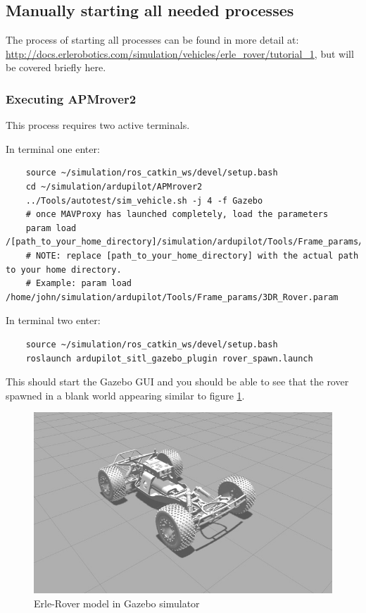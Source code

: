 \documentclass{report}
\begin{document}
\subsection{Manually starting all needed processes}
The process of starting all processes can be found in more detail at: \\ \href{http://docs.erlerobotics.com/simulation/vehicles/erle_rover/tutorial_1}{http://docs.erlerobotics.com/simulation/vehicles/erle\_rover/tutorial\_1}, but will be covered briefly here.
\subsubsection{Executing APMrover2}
This process requires two active terminals. 

In terminal one enter:
\begin{lstlisting}
	source ~/simulation/ros_catkin_ws/devel/setup.bash
	cd ~/simulation/ardupilot/APMrover2
	../Tools/autotest/sim_vehicle.sh -j 4 -f Gazebo
	# once MAVProxy has launched completely, load the parameters
	param load /[path_to_your_home_directory]/simulation/ardupilot/Tools/Frame_params/3DR_Rover.param
	# NOTE: replace [path_to_your_home_directory] with the actual path to your home directory.
	# Example: param load /home/john/simulation/ardupilot/Tools/Frame_params/3DR_Rover.param
\end{lstlisting}

In terminal two enter:
\begin{lstlisting}
	source ~/simulation/ros_catkin_ws/devel/setup.bash
	roslaunch ardupilot_sitl_gazebo_plugin rover_spawn.launch
\end{lstlisting}

This should start the Gazebo GUI and you should be able to see that the rover spawned in a blank world appearing similar to figure \ref{Erle-Rover-model}.

\begin{figure}[ht]
	\centering
	\includegraphics[scale = 0.35]{Images/rover}
	\caption{Erle-Rover model in Gazebo simulator}
	\label{Erle-Rover-model}
\end{figure}
\end{document}
